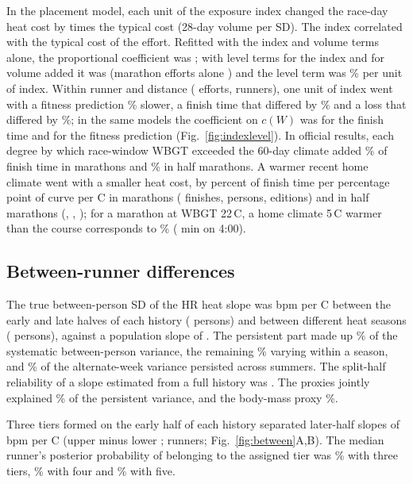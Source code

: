 \documentclass[12pt]{article}
\newcommand{\degC}{\,\textdegree C}
\newcommand{\cW}{$c(W)$}
\newcommand{\bpmC}{bpm per \textdegree C}
\begin{document}
In the placement model, each unit of the exposure index changed the race-day heat cost by \scoreRace{} times the typical cost (28-day volume \volumeRace{} per SD). The index correlated \formIndexCostCorr{} with the typical cost of the effort. Refitted with the index and volume terms alone, the proportional coefficient was \formInt; with level terms for the index and for volume added it was \formIntFree{} (marathon efforts alone \formIntFreeMar) and the level term was \formLevel\% per unit of index. Within runner and distance (\splitN{} efforts, \splitRunners{} runners), one unit of index went with a fitness prediction \splitPred\% slower, a finish time that differed by \splitFinish\% and a loss that differed by \splitLoss\%; in the same models the coefficient on \cW{} was \splitCurveFinish{} for the finish time and \splitCurvePred{} for the fitness prediction (Fig.~\ref{fig:indexlevel}). In official results, each degree by which race-window WBGT exceeded the 60-day climate added \devMar\% of finish time in marathons and \devHalf\% in half marathons. A warmer recent home climate went with a smaller heat cost, by \homeMarAlone{} percent of finish time per percentage point of curve per \textdegree C in marathons (\homeFinMar{} finishes, \homePersMar{} persons, \homeEdMar{} editions) and \homeHalfAlone{} in half marathons (\homeFinHalf, \homePersHalf, \homeEdHalf); for a marathon at WBGT 22\degC, a home climate 5\degC{} warmer than the course corresponds to \homeIllusMar\% (\homeIllusMarMin{} min on 4:00).

\subsection{Between-runner differences}
The true between-person SD of the HR heat slope was \sdPersistent{} \bpmC{} between the early and late halves of each history (\nSlopePersons{} persons) and \sdSeasons{} between different heat seasons (\nSeasonsPersons{} persons), against a population slope of \hrSlope. The persistent part made up \sharePersistent\% of the systematic between-person variance, the remaining \shareSameSeason\% varying within a season, and \acrossSummers\% of the alternate-week variance persisted across summers. The split-half reliability of a slope estimated from a full history was \reliability. The proxies jointly explained \proxyShare\% of the persistent variance, and the body-mass proxy \massShare\%.

Three tiers formed on the early half of each history separated later-half slopes of \tierLate{} \bpmC{} (upper minus lower \tierGap; \nTierRunners{} runners; Fig.~\ref{fig:between}A,B). The median runner's posterior probability of belonging to the assigned tier was \postThree\% with three tiers, \postFour\% with four and \postFive\% with five.
\end{document}
